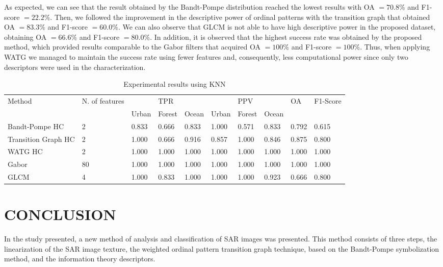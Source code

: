 \documentclass[journal]{IEEEtran}
\begin{document}
As expected, we can see that the result obtained by the Bandt-Pompe distribution reached the lowest results with OA $= 70.8\%$ and F1-score $= 22.2\%$.
Then, we followed the improvement in the descriptive power of ordinal patterns with the transition graph that obtained OA $= 83.3\%$ and F1-score $= 60.0\%$.
We can also observe that GLCM is not able to have high descriptive power in the proposed dataset, obtaining OA $= 66.6\%$ and F1-score $= 80.0\%$.
In addition, it is observed that the highest success rate was obtained by the proposed method, which provided results comparable to the Gabor filters that acquired OA $= 100\%$ and F1-score $= 100\%$.
Thus, when applying WATG we managed to maintain the success rate using fewer features and, consequently, less computational power since only two descriptors were used in the characterization.

\begin{table}[hbt]
	\centering
	\caption{Experimental results using KNN}
	\label{tab:result1}
	\begin{tabular}{|l|l|lll|lll|l|l|}
		\hline
		Method      & N. of features         &       & TPR   &       &       & PPV    &       & OA  & F1-Score \\ \cline{3-8} 
		&   & Urban & Forest & Ocean & Urban & Forest & Ocean & &  \\\hline
		Bandt-Pompe HC   & 2 & 0.833 &  0.666  & 0.833 & 1.000 & 0.571  & 0.833 & 0.792 &  0.615  \\ 
		Transition Graph HC & 2  & 1.000 & 0.666  & 0.916 & 0.857 & 1.000  & 0.846 & 0.875 & 0.800 \\
		WATG HC         & 2  & 1.000 & 1.000  & 1.000 & 1.000 & 1.000  & 1.000 & 1.000 & 1.000 \\ 
		Gabor           & 80  & 1.000 & 1.000  & 1.000 & 1.000 & 1.000  & 1.000 & 1.000 & 1.000\\
		GLCM            & 4   & 1.000 & 0.833  & 1.000 & 1.000 & 1.000  & 0.923 & 0.666 & 0.800\\
		\hline
	\end{tabular}
\end{table}

\section{CONCLUSION}\label{Conclusion}

In the study presented, a new method of analysis and classification of SAR images was presented.
This method consists of three steps, the linearization of the SAR image texture, the weighted ordinal pattern transition graph technique, based on the Bandt-Pompe symbolization method, and the information theory descriptors.
\end{document}
